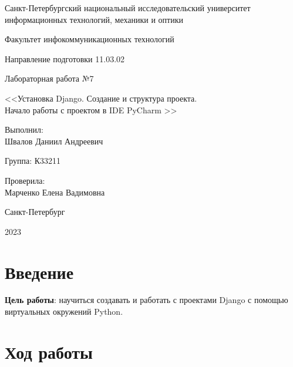 \documentclass[a4paper, 14pt]{extarticle}
\begin{document}
\begin{titlepage}
  \vspace{0pt plus2fill}
  \noindent

  \vspace{0pt plus6fill}
  \begin{center}
    Санкт-Петербургский национальный исследовательский университет
    информационных технологий, механики и оптики

    \vspace{0pt plus3fill}

    Факультет инфокоммуникационных технологий

    Направление подготовки 11.03.02

    \vspace{0pt plus2fill}

    Лабораторная работа №7

    <<Установка Django. Создание и структура проекта. \\ Начало работы с проектом в IDE PyCharm >>

  \end{center}

  \vspace{0pt plus9fill}
  \begin{flushright}
    Выполнил: \\
    Швалов Даниил Андреевич

    Группа: К33211

    Проверила: \\
    Марченко Елена Вадимовна
  \end{flushright}

  \vspace{0pt plus2fill}
  \begin{center}
    Санкт-Петербург

    2023
  \end{center}
\end{titlepage}

\section{Введение}

\textbf{Цель работы}: научиться создавать и работать с проектами Django с
помощью виртуальных окружений Python.

\section{Ход работы}
\end{document}
